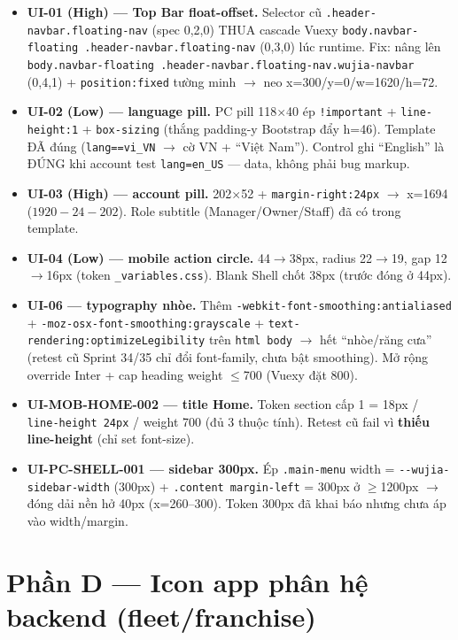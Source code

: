 \begin{itemize}
  \item \textbf{UI-01 (High) --- Top Bar float-offset.} Selector cũ \texttt{.header-navbar.floating-nav}
    (spec 0,2,0) THUA cascade Vuexy \texttt{body.navbar-floating .header-navbar.floating-nav} (0,3,0) lúc
    runtime. Fix: nâng lên \texttt{body.navbar-floating .header-navbar.floating-nav.wujia-navbar} (0,4,1)
    + \texttt{position:fixed} tường minh $\to$ neo x=300/y=0/w=1620/h=72.
  \item \textbf{UI-02 (Low) --- language pill.} PC pill 118$\times$40 ép \texttt{!important} +
    \texttt{line-height:1} + \texttt{box-sizing} (thắng padding-y Bootstrap đẩy h=46). Template ĐÃ đúng
    (\texttt{lang==vi\_VN} $\to$ cờ VN + ``Việt Nam''). Control ghi ``English'' là ĐÚNG khi account
    test \texttt{lang=en\_US} --- data, không phải bug markup.
  \item \textbf{UI-03 (High) --- account pill.} 202$\times$52 + \texttt{margin-right:24px} $\to$ x=1694
    ($1920-24-202$). Role subtitle (Manager/Owner/Staff) đã có trong template.
  \item \textbf{UI-04 (Low) --- mobile action circle.} 44$\to$38px, radius 22$\to$19, gap 12$\to$16px
    (token \texttt{\_variables.css}). Blank Shell chốt 38px (trước đóng ở 44px).
  \item \textbf{UI-06 --- typography nhòe.} Thêm \texttt{-webkit-font-smoothing:antialiased} +
    \texttt{-moz-osx-font-smoothing:grayscale} + \texttt{text-rendering:optimizeLegibility} trên
    \texttt{html body} $\to$ hết ``nhòe/răng cưa'' (retest cũ Sprint 34/35 chỉ đổi font-family, chưa bật
    smoothing). Mở rộng override Inter + cap heading weight $\leq$700 (Vuexy đặt 800).
  \item \textbf{UI-MOB-HOME-002 --- title Home.} Token section cấp 1 = 18px / \texttt{line-height 24px} /
    weight 700 (đủ 3 thuộc tính). Retest cũ fail vì \textbf{thiếu line-height} (chỉ set font-size).
  \item \textbf{UI-PC-SHELL-001 --- sidebar 300px.} Ép \texttt{.main-menu} width =
    \texttt{-{}-wujia-sidebar-width} (300px) + \texttt{.content margin-left} = 300px ở $\geq$1200px $\to$
    đóng dải nền hở 40px (x=260--300). Token 300px đã khai báo nhưng chưa áp vào width/margin.
\end{itemize}

\section{Phần D --- Icon app phân hệ backend (fleet/franchise)}

